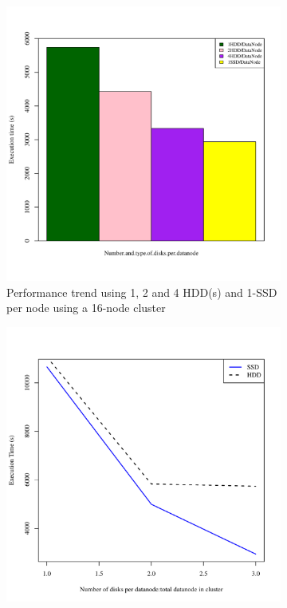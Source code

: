 \documentclass[conference]{IEEEtran}
\begin{document}
\begin{figure}[h]
  \centering
  \begin{subfigure}[b]{0.23\textwidth}
          \includegraphics[width=\textwidth]{Figure/PerormanceData/Plots/SSDHDDSameNode.pdf}
          \caption{Performance trend using 1, 2 and 4 HDD(s) and 1-SSD per node using a 16-node cluster}
          \label{fig:SsdN4Hdd}
  \end{subfigure}
  \begin{subfigure}[b]{0.23\textwidth}
          \includegraphics[width=\textwidth]{Figure/PerormanceData/Plots/SSDHDDDiffNode.pdf}

\end{subfigure}
\end{figure}
\end{document}
